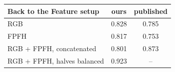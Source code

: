 \begin{tabular}{lcc}
\toprule
Back to the Feature setup & ours & published \\
\midrule
RGB & 0.828 & 0.785 \\
FPFH & 0.817 & 0.753 \\
RGB + FPFH, concatenated & 0.801 & 0.873 \\
RGB + FPFH, halves balanced & 0.923 & -- \\
\bottomrule
\end{tabular}
